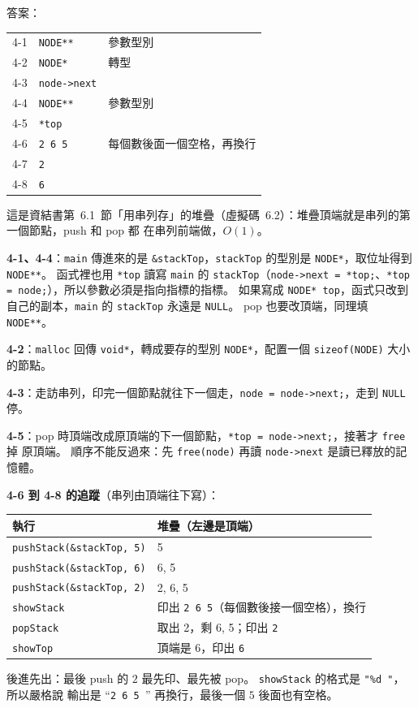\begin{pastsoln}
答案：
\begin{center}
\begin{tabular}{lll}
\toprule
4-1 & \texttt{NODE**} & 參數型別 \\
4-2 & \texttt{NODE*} & 轉型 \\
4-3 & \texttt{node->next} & \\
4-4 & \texttt{NODE**} & 參數型別 \\
4-5 & \texttt{*top} & \\
4-6 & \texttt{2 6 5} & 每個數後面一個空格，再換行 \\
4-7 & \texttt{2} & \\
4-8 & \texttt{6} & \\
\bottomrule
\end{tabular}
\end{center}

這是資結書第~6.1~節「用串列存」的堆疊（虛擬碼~6.2）：堆疊頂端就是串列的第一個節點，push 和 pop 都
在串列前端做，$O(1)$。

\textbf{4-1、4-4}：\texttt{main} 傳進來的是 \texttt{\&stackTop}，\texttt{stackTop} 的型別是
\texttt{NODE*}，取位址得到 \texttt{NODE**}。 函式裡也用 \texttt{*top} 讀寫 \texttt{main} 的
\texttt{stackTop}（\texttt{node->next = *top;}、\texttt{*top = node;}），所以參數必須是指向指標的指標。
如果寫成 \texttt{NODE* top}，函式只改到自己的副本，\texttt{main} 的 \texttt{stackTop} 永遠是
\texttt{NULL}。 pop 也要改頂端，同理填 \texttt{NODE**}。

\textbf{4-2}：\texttt{malloc} 回傳 \texttt{void*}，轉成要存的型別 \texttt{NODE*}，配置一個
\texttt{sizeof(NODE)} 大小的節點。

\textbf{4-3}：走訪串列，印完一個節點就往下一個走，\texttt{node = node->next;}，走到 \texttt{NULL}
停。

\textbf{4-5}：pop 時頂端改成原頂端的下一個節點，\texttt{*top = node->next;}，接著才 \texttt{free} 掉
原頂端。 順序不能反過來：先 \texttt{free(node)} 再讀 \texttt{node->next} 是讀已釋放的記憶體。

\textbf{4-6 到 4-8 的追蹤}（串列由頂端往下寫）：
\begin{center}
\begin{tabular}{ll}
\toprule
執行 & 堆疊（左邊是頂端） \\
\midrule
\texttt{pushStack(\&stackTop, 5)} & 5 \\
\texttt{pushStack(\&stackTop, 6)} & 6, 5 \\
\texttt{pushStack(\&stackTop, 2)} & 2, 6, 5 \\
\texttt{showStack} & 印出 \texttt{2 6 5}（每個數後接一個空格），換行 \\
\texttt{popStack} & 取出 2，剩 6, 5；印出 \texttt{2} \\
\texttt{showTop} & 頂端是 6，印出 \texttt{6} \\
\bottomrule
\end{tabular}
\end{center}
後進先出：最後 push 的 $2$ 最先印、最先被 pop。 \texttt{showStack} 的格式是 \texttt{"\%d "}，所以嚴格說
輸出是 ``\verb*|2 6 5 |'' 再換行，最後一個 $5$ 後面也有空格。
\end{pastsoln}
